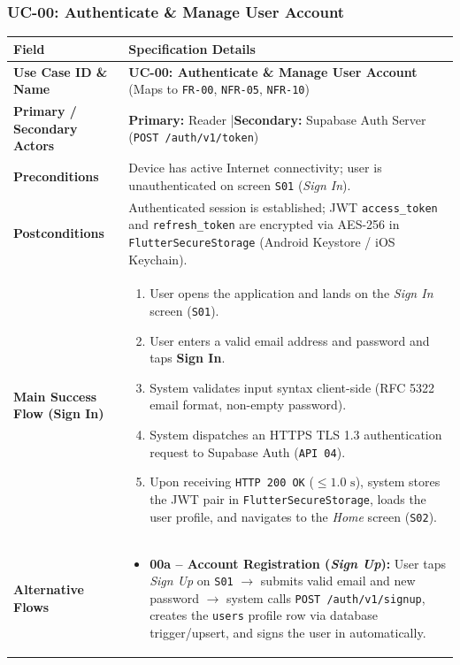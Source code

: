 \subsubsection{UC-00: Authenticate \& Manage User Account}
\begin{table}[H]
\footnotesize
\renewcommand{\arraystretch}{1.22}
\begin{tabularx}{\textwidth}{L{3.2cm} Y}
\toprule
{}
\textbf{Field} & \textbf{Specification Details} \\
\midrule
\textbf{Use Case ID \& Name} & \textbf{UC-00: Authenticate \& Manage User Account} (Maps to \texttt{FR-00}, \texttt{NFR-05}, \texttt{NFR-10}) \\
\textbf{Primary / Secondary Actors} & \textbf{Primary:} Reader \quad|\quad \textbf{Secondary:} Supabase Auth Server (\texttt{POST /auth/v1/token}) \\
\textbf{Preconditions} & Device has active Internet connectivity; user is unauthenticated on screen \texttt{S01} (\textit{Sign In}). \\
\textbf{Postconditions} & Authenticated session is established; JWT \texttt{access\_token} and \texttt{refresh\_token} are encrypted via AES-256 in \texttt{FlutterSecureStorage} (Android Keystore / iOS Keychain). \\
\textbf{Main Success Flow (Sign In)} &
\begin{enumerate}[nosep,leftmargin=1.4em]
    \item User opens the application and lands on the \textit{Sign In} screen (\texttt{S01}).
    \item User enters a valid email address and password and taps \textbf{Sign In}.
    \item System validates input syntax client-side (RFC 5322 email format, non-empty password).
    \item System dispatches an HTTPS TLS 1.3 authentication request to Supabase Auth (\texttt{API 04}).
    \item Upon receiving \texttt{HTTP 200 OK} ($\le 1.0\text{ s}$), system stores the JWT pair in \texttt{FlutterSecureStorage}, loads the user profile, and navigates to the \textit{Home} screen (\texttt{S02}).
\end{enumerate} \\
\textbf{Alternative Flows} &
\begin{itemize}[nosep,leftmargin=1.4em]
    \item \textbf{00a -- Account Registration (\textit{Sign Up}):} User taps \textit{Sign Up} on \texttt{S01} $\to$ submits valid email and new password $\to$ system calls \texttt{POST /auth/v1/signup}, creates the \texttt{users} profile row via database trigger/upsert, and signs the user in automatically.

\end{itemize}
\end{tabularx}
\end{table}
